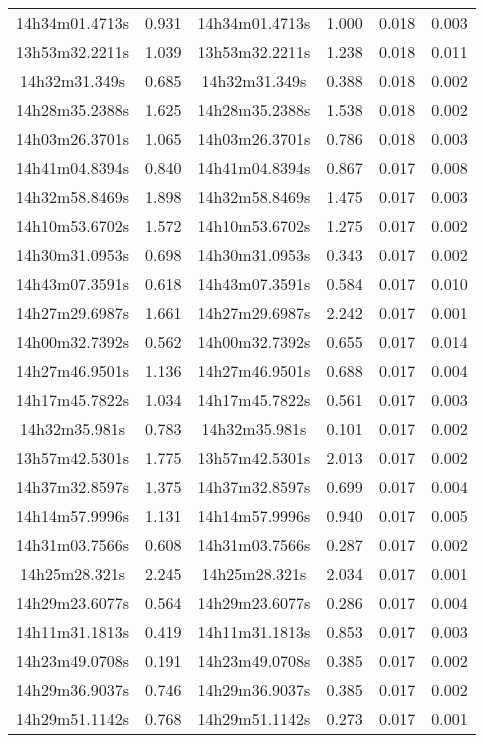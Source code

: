 \begin{table}
\begin{tabular}{cccccc}
14h34m01.4713s & 0.931 & 14h34m01.4713s & 1.000 & 0.018 & 0.003 \\
13h53m32.2211s & 1.039 & 13h53m32.2211s & 1.238 & 0.018 & 0.011 \\
14h32m31.349s & 0.685 & 14h32m31.349s & 0.388 & 0.018 & 0.002 \\
14h28m35.2388s & 1.625 & 14h28m35.2388s & 1.538 & 0.018 & 0.002 \\
14h03m26.3701s & 1.065 & 14h03m26.3701s & 0.786 & 0.018 & 0.003 \\
14h41m04.8394s & 0.840 & 14h41m04.8394s & 0.867 & 0.017 & 0.008 \\
14h32m58.8469s & 1.898 & 14h32m58.8469s & 1.475 & 0.017 & 0.003 \\
14h10m53.6702s & 1.572 & 14h10m53.6702s & 1.275 & 0.017 & 0.002 \\
14h30m31.0953s & 0.698 & 14h30m31.0953s & 0.343 & 0.017 & 0.002 \\
14h43m07.3591s & 0.618 & 14h43m07.3591s & 0.584 & 0.017 & 0.010 \\
14h27m29.6987s & 1.661 & 14h27m29.6987s & 2.242 & 0.017 & 0.001 \\
14h00m32.7392s & 0.562 & 14h00m32.7392s & 0.655 & 0.017 & 0.014 \\
14h27m46.9501s & 1.136 & 14h27m46.9501s & 0.688 & 0.017 & 0.004 \\
14h17m45.7822s & 1.034 & 14h17m45.7822s & 0.561 & 0.017 & 0.003 \\
14h32m35.981s & 0.783 & 14h32m35.981s & 0.101 & 0.017 & 0.002 \\
13h57m42.5301s & 1.775 & 13h57m42.5301s & 2.013 & 0.017 & 0.002 \\
14h37m32.8597s & 1.375 & 14h37m32.8597s & 0.699 & 0.017 & 0.004 \\
14h14m57.9996s & 1.131 & 14h14m57.9996s & 0.940 & 0.017 & 0.005 \\
14h31m03.7566s & 0.608 & 14h31m03.7566s & 0.287 & 0.017 & 0.002 \\
14h25m28.321s & 2.245 & 14h25m28.321s & 2.034 & 0.017 & 0.001 \\
14h29m23.6077s & 0.564 & 14h29m23.6077s & 0.286 & 0.017 & 0.004 \\
14h11m31.1813s & 0.419 & 14h11m31.1813s & 0.853 & 0.017 & 0.003 \\
14h23m49.0708s & 0.191 & 14h23m49.0708s & 0.385 & 0.017 & 0.002 \\
14h29m36.9037s & 0.746 & 14h29m36.9037s & 0.385 & 0.017 & 0.002 \\
14h29m51.1142s & 0.768 & 14h29m51.1142s & 0.273 & 0.017 & 0.001 \\

\end{tabular}
\end{table}
